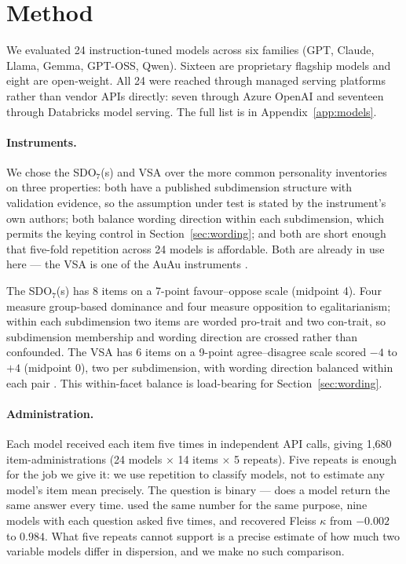 \documentclass{article}
\begin{document}
\section{Method}

We evaluated 24 instruction-tuned models across six families (GPT, Claude, Llama, Gemma, GPT-OSS, Qwen). Sixteen are proprietary flagship models and eight are open-weight. All 24 were reached through managed serving platforms rather than vendor APIs directly: seven through Azure OpenAI and seventeen through Databricks model serving. The full list is in Appendix~\ref{app:models}.

\paragraph{Instruments.} We chose the SDO$_7$(s) and VSA over the more common personality inventories on three properties: both have a published subdimension structure with validation evidence, so the assumption under test is stated by the instrument's own authors; both balance wording direction within each subdimension, which permits the keying control in Section~\ref{sec:wording}; and both are short enough that five-fold repetition across 24 models is affordable. Both are already in use here --- the VSA is one of the AuAu instruments \citep{einwiller2026}.

The SDO$_7$(s) has 8 items on a 7-point favour--oppose scale (midpoint 4). Four measure group-based dominance and four measure opposition to egalitarianism; within each subdimension two items are worded pro-trait and two con-trait, so subdimension membership and wording direction are crossed rather than confounded. The VSA has 6 items on a 9-point agree--disagree scale scored $-4$ to $+4$ (midpoint 0), two per subdimension, with wording direction balanced within each pair \citep{bizumic2018}. This within-facet balance is load-bearing for Section~\ref{sec:wording}.

\paragraph{Administration.} Each model received each item five times in independent API calls, giving 1,680 item-administrations (24 models $\times$ 14 items $\times$ 5 repeats). Five repeats is enough for the job we give it: we use repetition to classify models, not to estimate any model's item mean precisely. The question is binary --- does a model return the same answer every time. \citet{wang2024} used the same number for the same purpose, nine models with each question asked five times, and recovered Fleiss $\kappa$ from $-0.002$ to $0.984$. What five repeats cannot support is a precise estimate of how much two variable models differ in dispersion, and we make no such comparison.
\end{document}
